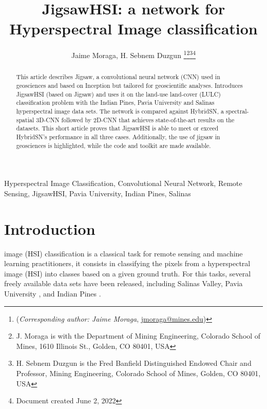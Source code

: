 \documentclass[lettersize, journal]{IEEEtran}
\begin{document}
\title{JigsawHSI: a network for Hyperspectral Image classification}

\author{Jaime Moraga, H. Sebnem Duzgun
\thanks{(\textit{Corresponding author: Jaime Moraga}, \href{mailto:jmoraga@mines.edu}{jmoraga@mines.edu})}\thanks{J. Moraga is with the Department of Mining Engineering, Colorado School of Mines, 1610 Illinois St., Golden, CO 80401, USA }\thanks{H. Sebnem Duzgun is the Fred Banfield Distinguished Endowed Chair and Professor, Mining Engineering, Colorado School of Mines,
Golden, CO 80401, USA}\thanks{Document created June 2, 2022}}





\maketitle

\begin{abstract}
This article describes Jigsaw, a convolutional neural network (CNN) used in geosciences and based on Inception \cite{szegedy_inception-v4_2017} but tailored for geoscientific analyses. Introduces JigsawHSI (based on Jigsaw) and uses it on the land-use land-cover (LULC) classification problem with the Indian Pines, Pavia University and Salinas hyperspectral image data sets. The network is compared against HybridSN\cite{roy_hybridsn_2020}, a spectral-spatial 3D-CNN followed by 2D-CNN that achieves state-of-the-art results on the datasets. This short article proves that JigsawHSI is able to meet or exceed HybridSN's performance in all three cases. Additionally, the use of jigsaw in geosciences is highlighted, while  the code and toolkit are made available. 
\end{abstract}

\begin{IEEEkeywords}
Hyperspectral Image Classification, Convolutional Neural Network, Remote Sensing, JigsawHSI, Pavia University, Indian Pines, Salinas
\end{IEEEkeywords}

\section{Introduction}
 image (HSI) classification is a classical task for remote sensing and machine learning practitioners, it consists in classifying the pixels from a hyperspectral image (HSI) into classes based on a given ground truth. For this tasks, several freely available data sets have been released, including Salinas Valley, Pavia University \cite{gamba_collection_2004}, and Indian Pines \cite{baumgardner_220_2015}. 
\end{document}
